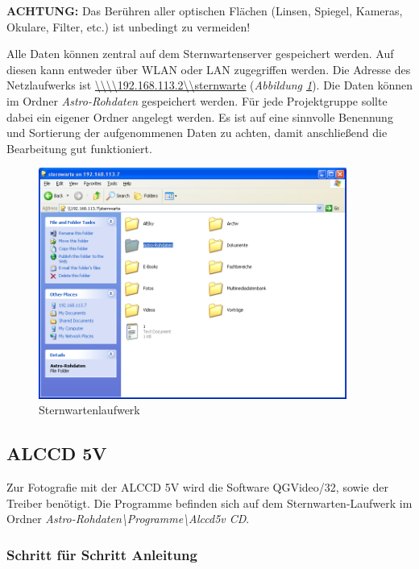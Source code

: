 \documentclass[10pt,a4paper,titlepage]{article}
\begin{document}
\textbf{ACHTUNG:} Das Berühren aller optischen Flächen (Linsen, Spiegel, Kameras, Okulare, Filter, etc.) ist unbedingt zu vermeiden!

Alle Daten können zentral auf dem Sternwartenserver gespeichert werden. Auf diesen kann entweder über WLAN oder LAN zugegriffen werden. Die Adresse des Netzlaufwerks ist \url{\\\\192.168.113.2\\sternwarte} (\textit{Abbildung \ref{fig:laufwerk}}). Die Daten können im Ordner \textit{Astro-Rohdaten} gespeichert werden. Für jede Projektgruppe sollte dabei ein eigener Ordner angelegt werden. Es ist auf eine sinnvolle Benennung und Sortierung der aufgenommenen Daten zu achten, damit anschließend die Bearbeitung gut funktioniert.

\begin{figure}[h!]
  \centering
    \includegraphics[width=0.9\textwidth]{Laufwerk}
  \caption{Sternwartenlaufwerk}
  \label{fig:laufwerk}
\end{figure}


\subsection{ALCCD 5V}
Zur Fotografie mit der ALCCD 5V wird die Software QGVideo/32, sowie der Treiber benötigt. Die Programme befinden sich auf dem Sternwarten-Laufwerk im Ordner \textit{Astro-Rohdaten\textbackslash Programme\textbackslash Alccd5v CD}.

\subsubsection{Schritt für Schritt Anleitung}
\end{document}
